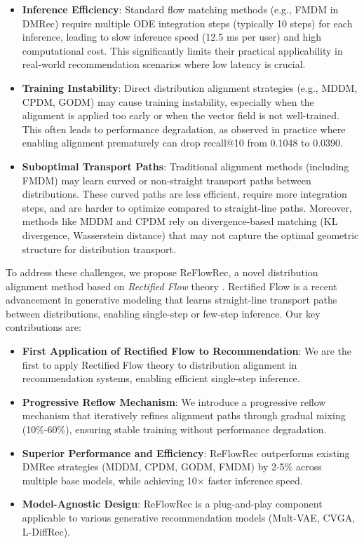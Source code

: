 \documentclass[sigconf]{acmart}
\begin{document}
\begin{itemize}[leftmargin=*]
\item[$\bullet$] \textbf{Inference Efficiency}: Standard flow matching methods (e.g., FMDM in DMRec) require multiple ODE integration steps (typically 10 steps) for each inference, leading to slow inference speed (12.5 ms per user) and high computational cost. This significantly limits their practical applicability in real-world recommendation scenarios where low latency is crucial.
\item[$\bullet$] \textbf{Training Instability}: Direct distribution alignment strategies (e.g., MDDM, CPDM, GODM) may cause training instability, especially when the alignment is applied too early or when the vector field is not well-trained. This often leads to performance degradation, as observed in practice where enabling alignment prematurely can drop recall@10 from 0.1048 to 0.0390.
\item[$\bullet$] \textbf{Suboptimal Transport Paths}: Traditional alignment methods (including FMDM) may learn curved or non-straight transport paths between distributions. These curved paths are less efficient, require more integration steps, and are harder to optimize compared to straight-line paths. Moreover, methods like MDDM and CPDM rely on divergence-based matching (KL divergence, Wasserstein distance) that may not capture the optimal geometric structure for distribution transport.
\end{itemize}

To address these challenges, we propose \textsf{ReFlowRec}, a novel distribution alignment method based on \textit{Rectified Flow} theory \cite{lipman2023rectified}. Rectified Flow is a recent advancement in generative modeling that learns straight-line transport paths between distributions, enabling single-step or few-step inference. Our key contributions are:

\begin{itemize}[leftmargin=*]
\item[$\bullet$] \textbf{First Application of Rectified Flow to Recommendation}: We are the first to apply Rectified Flow theory to distribution alignment in recommendation systems, enabling efficient single-step inference.
\item[$\bullet$] \textbf{Progressive Reflow Mechanism}: We introduce a progressive reflow mechanism that iteratively refines alignment paths through gradual mixing (10\%-60\%), ensuring stable training without performance degradation.
\item[$\bullet$] \textbf{Superior Performance and Efficiency}: ReFlowRec outperforms existing DMRec strategies (MDDM, CPDM, GODM, FMDM) by 2-5\% across multiple base models, while achieving 10$\times$ faster inference speed.
\item[$\bullet$] \textbf{Model-Agnostic Design}: ReFlowRec is a plug-and-play component applicable to various generative recommendation models (Mult-VAE, CVGA, L-DiffRec).
\end{itemize}
\end{document}
